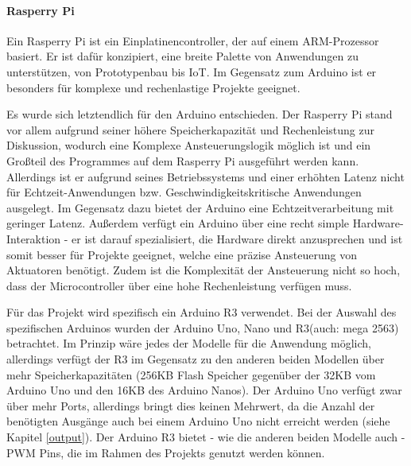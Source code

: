 \begin{enumerate}
\begin{minipage}{0.7\textwidth}
	\paragraph{Rasperry Pi}
	Ein Rasperry Pi ist ein Einplatinencontroller, der auf einem ARM-Prozessor basiert.
	Er ist dafür konzipiert, eine breite Palette von Anwendungen zu unterstützen, von Prototypenbau bis IoT.
	Im Gegensatz zum Arduino ist er besonders für komplexe und rechenlastige Projekte geeignet.
\end{minipage}
\newline

Es wurde sich letztendlich für den Arduino entschieden.
Der Rasperry Pi stand vor allem aufgrund seiner höhere Speicherkapazität und Rechenleistung zur Diskussion, wodurch eine Komplexe Ansteuerungslogik möglich ist und ein Großteil des Programmes auf dem Rasperry Pi ausgeführt werden kann.
Allerdings ist er aufgrund seines Betriebssystems und einer erhöhten Latenz nicht für Echtzeit-Anwendungen bzw. Geschwindigkeitskritische Anwendungen ausgelegt.
Im Gegensatz dazu bietet der Arduino eine Echtzeitverarbeitung mit geringer Latenz.
Außerdem verfügt ein Arduino über eine recht simple Hardware-Interaktion - er ist darauf spezialisiert, die Hardware direkt anzusprechen und ist somit besser für Projekte geeignet, welche eine präzise Ansteuerung von Aktuatoren benötigt.
Zudem ist die Komplexität der Ansteuerung nicht so hoch, dass der Microcontroller über eine hohe Rechenleistung verfügen muss.

Für das Projekt wird spezifisch ein Arduino R3 verwendet. Bei der Auswahl des spezifischen Arduinos wurden der Arduino Uno, Nano und R3(auch: mega 2563) betrachtet.
Im Prinzip wäre jedes der Modelle für die Anwendung möglich, allerdings verfügt der R3 im Gegensatz zu den anderen beiden Modellen über mehr Speicherkapazitäten (256KB Flash Speicher
gegenüber der 32KB vom Arduino Uno und den 16KB des Arduino Nanos).
Der Arduino Uno verfügt zwar über mehr Ports, allerdings bringt dies keinen Mehrwert, da die Anzahl der benötigten Ausgänge auch bei einem Arduino Uno nicht erreicht werden
(siehe Kapitel \ref{output}).
Der Arduino R3 bietet - wie die anderen beiden Modelle auch - \ac{PWM} Pins, die im Rahmen des Projekts genutzt werden können.


\end{enumerate}
